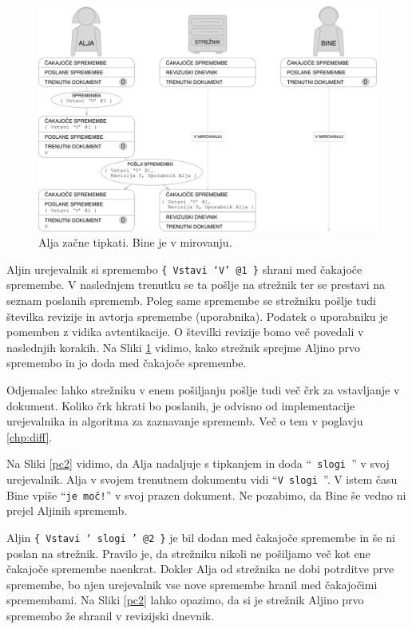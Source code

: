\documentclass[a4paper, 12pt, twoside]{book}
\begin{document}
\begin{figure}[placement h]
\begin{center}
\includegraphics[width=16cm]{img/pc1.pdf}
\end{center}
\caption{Alja začne tipkati. Bine je v mirovanju.}
\label{pc1}
\end{figure}

Aljin urejevalnik si spremembo {\tt \{ Vstavi ‘V’ @1 \}} shrani med čakajoče spremembe. V naslednjem trenutku se ta pošlje na strežnik ter se prestavi na seznam poslanih sprememb. Poleg same spremembe se strežniku pošlje tudi številka revizije in avtorja spremembe (uporabnika). Podatek o uporabniku je pomemben z vidika avtentikacije. O številki revizije bomo več povedali v naslednjih korakih. Na Sliki \ref{pc1} vidimo, kako strežnik sprejme Aljino prvo spremembo in jo doda med čakajoče spremembe.

Odjemalec lahko strežniku v enem pošiljanju pošlje tudi več črk za vstavljanje v dokument. Koliko črk hkrati bo poslanih, je odvisno od implementacije urejevalnika in algoritma za zaznavanje sprememb. Več o tem v poglavju \ref{chp:diff}.

\pagebreak

Na Sliki \ref{pc2} vidimo, da Alja nadaljuje s tipkanjem in doda “{\tt \ slogi }” v svoj urejevalnik. Alja v svojem trenutnem dokumentu vidi “{\tt V slogi }”. V istem času Bine vpiše “{\tt je moč!}” v svoj prazen dokument. Ne pozabimo, da Bine še vedno ni prejel Aljinih sprememb.

Aljin {\tt \{ Vstavi ‘ slogi ’ @2 \}} je bil dodan med čakajoče spremembe in še ni poslan na strežnik. Pravilo je, da strežniku nikoli ne pošiljamo več kot ene čakajoče spremembe naenkrat. Dokler Alja od strežnika ne dobi potrditve prve spremembe, bo njen urejevalnik vse nove spremembe hranil med čakajočimi spremembami. Na Sliki \ref{pc2} lahko opazimo, da si je strežnik Aljino prvo spremembo že shranil v revizijski dnevnik.
\end{document}
